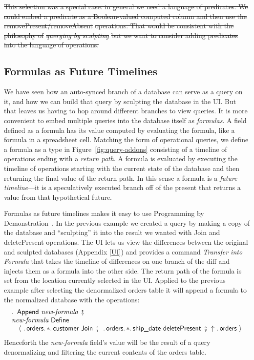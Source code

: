 \documentclass[english,submission]{programming}
\theoremstyle{definition}
\DeclareMathOperator{\exec}{\ \fatsemi\ \ }
\providecommand{\DIFdel}[1]{{\protect\color{red}\sout{#1}}} %
\providecommand{\DIFdelbegin}{} %
\providecommand{\DIFdelend}{} %
\begin{document}
\DIFdelbegin \DIFdel{This selection was a special case: in general we need a language of predicates. We could embed a predicate as a Boolean-valued computed column and then use the }\textsf{\DIFdel{removePresent/removeAbsent}} %
\DIFdel{operations. That would be consistent with the philosophy of }\textit{\DIFdel{querying by sculpting}} %
\DIFdel{but we want to consider adding predicates into the language of operations.
}%

\DIFdelend \subsection{Formulas as Future Timelines}\label{formulas}

We have seen how an auto-synced branch of a database can serve as a query on it, and how we can build that query by sculpting the database in the UI. But that leaves us having to hop around different branches to view queries. It is more convenient to embed multiple queries into the database itself as \textit{formulas}. A field defined as a formula has its value computed by evaluating the formula, like a formula in a spreadsheet cell. Matching the form of operational queries, we define a formula as a type in Figure~\ref{fig:query-addons} consisting of a timeline of operations ending with a \textit{return path}. A formula is evaluated by executing the timeline of operations starting with the current state of the database and then returning the final value of the return path. In this sense a formula is a \textit{future timeline}---it is a speculatively executed branch off of the present that returns a value from that hypothetical future.

Formulas as future timelines makes it easy to use Programming by Demonstration~\cite{cypher93-pbd}. In the previous example we created a query by making a copy of the database and ``sculpting'' it into the result we wanted with \textsf{Join} and \textsf{deletePresent} operations. The UI lets us view the differences between the original and sculpted databases (Appendix \ref{UI}) and provides a command \textit{Transfer into Formula} that takes the timeline of differences on one branch of the diff and injects them as a formula into the other side. The return path of the formula is set from the location currently selected in the UI. Applied to the previous example after selecting the denormalized \textsf{orders} table it will append a formula to the normalized database with the operations:
\[
\begin{array}{l}
  \ldotp \textsf{ Append } \textit{new-formula} \exec\\
  \textit{new-formula} \textsf{ Define } \\
  \quad \langle
\ \ldotp \textsf{orders}\ldotp * \ldotp \textsf{customer Join} \exec
\ldotp \textsf{orders}\ldotp * \ldotp \textsf{ship\_date deletePresent} \exec
\!\!\uparrow \ \ldotp \textsf{orders}\
  \rangle\\
\end{array}
\]
Henceforth the \textit{new-formula} field's value will be the result of a query  denormalizing and filtering the current contents of the orders table.
\end{document}
